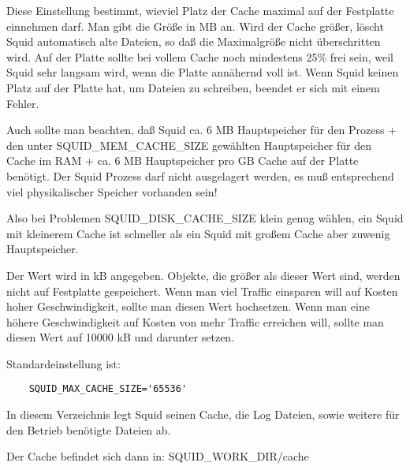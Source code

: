 \begin{description}
                Diese Einstellung bestimmt, wieviel Platz der Cache maximal
                auf der Festplatte einnehmen darf. Man gibt die Größe in MB
                an. Wird der Cache größer, löscht Squid automatisch alte
                Dateien, so daß die Maximalgröße nicht überschritten wird.
                Auf der Platte sollte bei vollem Cache noch mindestens 25\%
                frei sein, weil Squid sehr langsam wird, wenn die Platte
                annähernd voll ist. Wenn Squid keinen Platz auf der Platte
                hat, um Dateien zu schreiben, beendet er sich mit einem
                Fehler.

                Auch sollte man beachten, daß Squid ca. 6 MB Hauptspeicher
                für den Prozess + den unter SQUID\_MEM\_CACHE\_SIZE gewählten
                Hauptspeicher für den Cache im RAM + ca. 6 MB Hauptspeicher
                pro GB Cache auf der Platte benötigt. Der Squid Prozess darf
                nicht ausgelagert werden, es muß entsprechend viel
                physikalischer Speicher vorhanden sein!

                Also bei Problemen SQUID\_DISK\_CACHE\_SIZE klein genug
                wählen, ein Squid mit kleinerem Cache ist schneller als ein
                Squid mit großem Cache aber zuwenig Hauptspeicher.



                Der Wert wird in kB angegeben. Objekte, die größer als
                dieser Wert sind, werden nicht auf Festplatte gespeichert.
                Wenn man viel Traffic einsparen will auf Kosten hoher
                Geschwindigkeit, sollte man diesen Wert hochsetzen. Wenn man
                eine höhere Geschwindigkeit auf Kosten von mehr Traffic
                erreichen will, sollte man diesen Wert auf 10000 kB und
                darunter setzen.

                Standardeinstellung ist:
\begin{verbatim}
	SQUID_MAX_CACHE_SIZE='65536'
\end{verbatim}



                In diesem Verzeichnis legt Squid seinen Cache, die Log Dateien,
                sowie weitere für den Betrieb benötigte Dateien ab.

                Der Cache befindet sich dann in:
                                SQUID\_WORK\_DIR/cache


\end{description}
